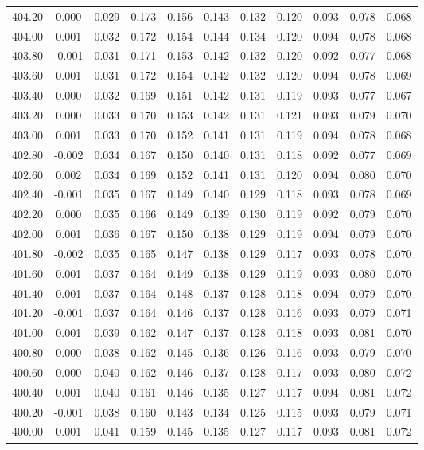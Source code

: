 \begin{longtable}{cccccccccc}
    404.20 &  0.000 &  0.029 &  0.173 &  0.156 &  0.143 &  0.132 &  0.120 &  0.093 &  0.078 &  0.068 \\
    404.00 &  0.001 &  0.032 &  0.172 &  0.154 &  0.144 &  0.134 &  0.120 &  0.094 &  0.078 &  0.068 \\
    403.80 & -0.001 &  0.031 &  0.171 &  0.153 &  0.142 &  0.132 &  0.120 &  0.092 &  0.077 &  0.068 \\
    403.60 &  0.001 &  0.031 &  0.172 &  0.154 &  0.142 &  0.132 &  0.120 &  0.094 &  0.078 &  0.069 \\
    403.40 &  0.000 &  0.032 &  0.169 &  0.151 &  0.142 &  0.131 &  0.119 &  0.093 &  0.077 &  0.067 \\
    403.20 &  0.000 &  0.033 &  0.170 &  0.153 &  0.142 &  0.131 &  0.121 &  0.093 &  0.079 &  0.070 \\
    403.00 &  0.001 &  0.033 &  0.170 &  0.152 &  0.141 &  0.131 &  0.119 &  0.094 &  0.078 &  0.068 \\
    402.80 & -0.002 &  0.034 &  0.167 &  0.150 &  0.140 &  0.131 &  0.118 &  0.092 &  0.077 &  0.069 \\
    402.60 &  0.002 &  0.034 &  0.169 &  0.152 &  0.141 &  0.131 &  0.120 &  0.094 &  0.080 &  0.070 \\
    402.40 & -0.001 &  0.035 &  0.167 &  0.149 &  0.140 &  0.129 &  0.118 &  0.093 &  0.078 &  0.069 \\
    402.20 &  0.000 &  0.035 &  0.166 &  0.149 &  0.139 &  0.130 &  0.119 &  0.092 &  0.079 &  0.070 \\
    402.00 &  0.001 &  0.036 &  0.167 &  0.150 &  0.138 &  0.129 &  0.119 &  0.094 &  0.079 &  0.070 \\
    401.80 & -0.002 &  0.035 &  0.165 &  0.147 &  0.138 &  0.129 &  0.117 &  0.093 &  0.078 &  0.070 \\
    401.60 &  0.001 &  0.037 &  0.164 &  0.149 &  0.138 &  0.129 &  0.119 &  0.093 &  0.080 &  0.070 \\
    401.40 &  0.001 &  0.037 &  0.164 &  0.148 &  0.137 &  0.128 &  0.118 &  0.094 &  0.079 &  0.070 \\
    401.20 & -0.001 &  0.037 &  0.164 &  0.146 &  0.137 &  0.128 &  0.116 &  0.093 &  0.079 &  0.071 \\
    401.00 &  0.001 &  0.039 &  0.162 &  0.147 &  0.137 &  0.128 &  0.118 &  0.093 &  0.081 &  0.070 \\
    400.80 &  0.000 &  0.038 &  0.162 &  0.145 &  0.136 &  0.126 &  0.116 &  0.093 &  0.079 &  0.070 \\
    400.60 &  0.000 &  0.040 &  0.162 &  0.146 &  0.137 &  0.128 &  0.117 &  0.093 &  0.080 &  0.072 \\
    400.40 &  0.001 &  0.040 &  0.161 &  0.146 &  0.135 &  0.127 &  0.117 &  0.094 &  0.081 &  0.072 \\
    400.20 & -0.001 &  0.038 &  0.160 &  0.143 &  0.134 &  0.125 &  0.115 &  0.093 &  0.079 &  0.071 \\
    400.00 &  0.001 &  0.041 &  0.159 &  0.145 &  0.135 &  0.127 &  0.117 &  0.093 &  0.081 &  0.072 \\
\end{longtable}
